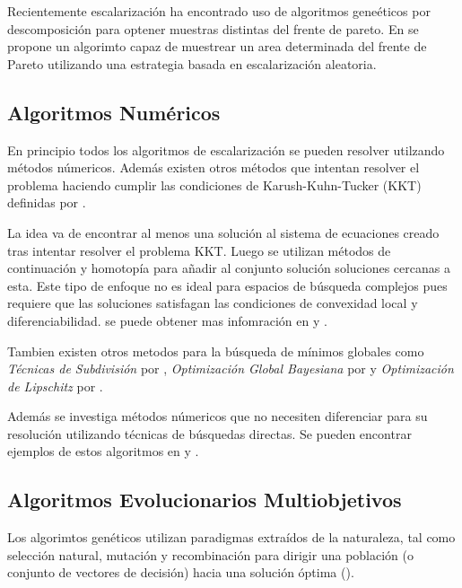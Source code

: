 Recientemente escalarizaci\'on ha encontrado uso de algoritmos gene\'eticos por descomposici\'on para optener muestras distintas del frente de pareto.  En \cite{paria2020flexible} se propone un algorimto capaz de muestrear un area determinada del frente de Pareto utilizando una estrategia basada en escalarizaci\'on aleatoria.


\subsection{Algoritmos Num\'ericos}

En principio todos los algoritmos de escalarizaci\'on se pueden resolver utilzando m\'etodos n\'umericos. Adem\'as existen otros m\'etodos  que intentan resolver el problema haciendo cumplir las condiciones de Karush-Kuhn-Tucker (KKT) definidas por \cite{kuhn2014nonlinear}.

La idea va de encontrar al menos una soluci\'on al sistema de ecuaciones creado tras intentar resolver el problema KKT. Luego se utilizan m\'etodos de continuaci\'on y homotop\'ia para añadir al conjunto soluci\'on soluciones cercanas a esta. 
Este tipo de enfoque no es ideal para espacios de b\'usqueda complejos pues requiere que las soluciones satisfagan las condiciones de convexidad local y diferenciabilidad. se puede obtener mas infomraci\'on en \cite{hillermeier2001nonlinear} y \cite{schutze_et_al:DagSemProc.04461.16}.

Tambien existen otros metodos para la b\'usqueda de m\'inimos globales como \textit{T\'ecnicas de Subdivisi\'on} por \cite{dellnitz2005covering}, \textit{Optimizaci\'on Global Bayesiana} por \cite{emmerich2016multicriteria} y \textit{Optimizaci\'on de Lipschitz} por \cite{vzilinskas2013worst}. %

Adem\'as  se investiga  m\'etodos n\'umericos que no necesiten diferenciar para su resoluci\'on utilizando t\'ecnicas de b\'usquedas directas. Se pueden encontrar ejemplos de estos algoritmos en \cite{custodio2011direct} y \cite{audet2010mesh}.

\subsection{Algoritmos Evolucionarios Multiobjetivos }

Los algorimtos gen\'eticos utilizan paradigmas extra\'idos de la naturaleza, tal como selecci\'on natural, mutaci\'on y recombinaci\'on para dirigir una poblaci\'on (o conjunto de vectores de decisi\'on) hacia una soluci\'on \'optima (\cite{back1996evolutionary}).

